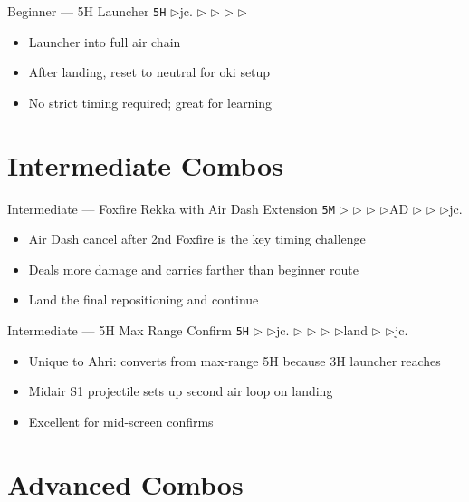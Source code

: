 \documentclass[12pt, a4paper]{report}
\newcommand{\arrow}{\textbf{\textcolor{ahriGold}{$\triangleright$}}\hspace{0.1em}}
\newcommand{\notation}[1]{{\small\texttt{\textcolor{ahriCyan}{#1}}}}
\begin{document}
\begin{combobox}[]{Beginner --- 5H Launcher}
\notation{5H} \arrow jc. \arrow \notation{j.L} \arrow \notation{j.M} \arrow \notation{j.H} \arrow \notation{j.2S1}
\begin{itemize}
  \item Launcher into full air chain
  \item After landing, reset to neutral for oki setup
  \item No strict timing required; great for learning
\end{itemize}
\end{combobox}

\section{Intermediate Combos}

\begin{combobox}[]{Intermediate --- Foxfire Rekka with Air Dash Extension}
\notation{5M} \arrow \notation{5H} \arrow \notation{S1} \arrow \notation{S1} \arrow AD \arrow \notation{j.M} \arrow \notation{3H} \arrow jc.
\begin{itemize}
  \item Air Dash cancel after 2nd Foxfire is the key timing challenge
  \item Deals more damage and carries farther than beginner route
  \item Land the final repositioning and continue
\end{itemize}
\end{combobox}

\begin{combobox}[]{Intermediate --- 5H Max Range Confirm}
\notation{5H} \arrow \notation{3H} \arrow jc. \arrow \notation{j.M} \arrow \notation{j.H} \arrow \notation{j.S1} \arrow land \arrow \notation{3H} \arrow jc.
\begin{itemize}
  \item Unique to Ahri: converts from max-range 5H because 3H launcher reaches
  \item Midair S1 projectile sets up second air loop on landing
  \item Excellent for mid-screen confirms
\end{itemize}
\end{combobox}

\section{Advanced Combos}
\end{document}
